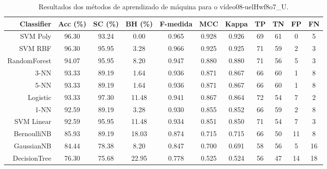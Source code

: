 \begin{table}[!htb]
\centering
\caption{Resultados dos métodos de aprendizado de máquina para o vídeo08-uelHwf8o7_U.}
\label{tab:08-uelHwf8o7_U}
\begin{tabular}{r|c|c|c|c|c|c|c|c|c|c}
\hline\hline
Classifier & Acc (\%) & SC (\%) & BH (\%) & F-medida & MCC & Kappa & TP & TN & FP & FN \\ \hline
SVM Poly & 96.30 & 93.24 & 0.00 & 0.965 & 0.928 & 0.926 & 69 & 61 & 0 & 5 \\ 
SVM RBF & 96.30 & 95.95 & 3.28 & 0.966 & 0.925 & 0.925 & 71 & 59 & 2 & 3 \\ 
RandomForest & 94.07 & 95.95 & 8.20 & 0.947 & 0.880 & 0.880 & 71 & 56 & 5 & 3 \\ 
3-NN & 93.33 & 89.19 & 1.64 & 0.936 & 0.871 & 0.867 & 66 & 60 & 1 & 8 \\ 
5-NN & 93.33 & 89.19 & 1.64 & 0.936 & 0.871 & 0.867 & 66 & 60 & 1 & 8 \\ 
Logistic & 93.33 & 97.30 & 11.48 & 0.941 & 0.867 & 0.864 & 72 & 54 & 7 & 2 \\ 
1-NN & 92.59 & 89.19 & 3.28 & 0.930 & 0.855 & 0.852 & 66 & 59 & 2 & 8 \\ 
SVM Linear & 92.59 & 95.95 & 11.48 & 0.934 & 0.851 & 0.850 & 71 & 54 & 7 & 3 \\ 
BernoulliNB & 85.93 & 89.19 & 18.03 & 0.874 & 0.715 & 0.715 & 66 & 50 & 11 & 8 \\ 
GaussianNB & 84.44 & 78.38 & 8.20 & 0.847 & 0.700 & 0.691 & 58 & 56 & 5 & 16 \\ 
DecisionTree & 76.30 & 75.68 & 22.95 & 0.778 & 0.525 & 0.524 & 56 & 47 & 14 & 18 \\ 
\hline\hline
\end{tabular}
\end{table}
